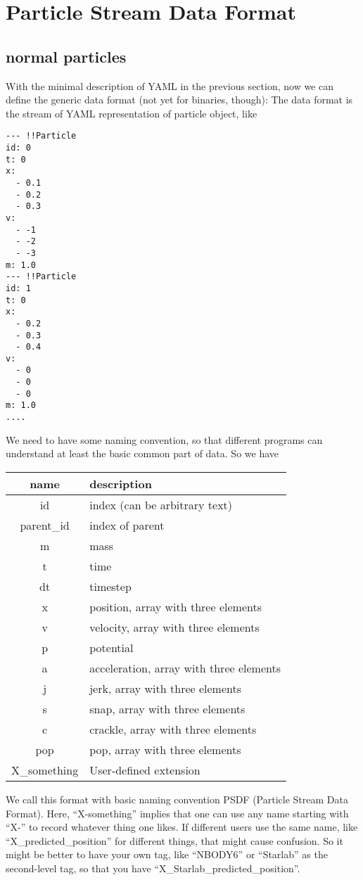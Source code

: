 \documentclass[12pt]{article}
\begin{document}
\section{Particle Stream Data Format}


\subsection{normal particles}

With the  minimal description of YAML in the previous section, now
we can define the generic data format (not yet for binaries, though):
The data format is the stream of YAML representation of particle
object, like

\begin{verbatim}
--- !!Particle
id: 0
t: 0
x:
  - 0.1
  - 0.2
  - 0.3
v:
  - -1
  - -2
  - -3
m: 1.0
--- !!Particle
id: 1
t: 0
x:
  - 0.2
  - 0.3
  - 0.4
v:
  - 0
  - 0
  - 0
m: 1.0
....
\end{verbatim}
We need to have some naming convention, so that different programs can
understand at least the basic common part of data. So we have

\begin{center}
\begin{tabular}{|c|l|}
\hline
name & description\\
\hline
id & index (can be arbitrary text)\\
parent\_id & index  of parent\\
m & mass\\
t & time\\
dt & timestep\\
x  & position, array with three elements\\
v  & velocity, array with three elements\\
p  & potential\\
a  & acceleration, array with three elements\\
j  & jerk, array with three elements\\
s  & snap, array with three elements\\
c  & crackle, array with three elements\\
pop  & pop, array with three elements\\
X\_something & User-defined extension\\
\hline
\end{tabular}
\end{center}

We call this format with basic naming convention PSDF (Particle Stream
Data Format). Here, ``X-something'' implies that one can use any name
starting with ``X-'' to record whatever thing one likes. If different
users use the same name, like ``X\_predicted\_position'' for different
things, that might cause confusion. So it might be better to have your
own tag, like ``NBODY6'' or ``Starlab'' as the second-level tag, so
that you have ``X\_Starlab\_predicted\_position''.
\end{document}
